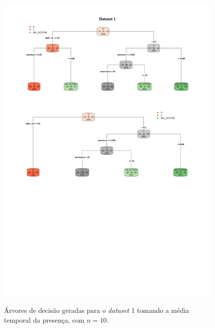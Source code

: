 \begin{figure}[hp]
	\centering
	\caption{Árvores de decisão geradas para o \textit{dataset} 1 tomando a média temporal da presença, com $n=10$.}
  \includegraphics[width=\textwidth]{imagens/teste_learning/5_1.pdf}
  \label{fig:teste_5_1}  
\end{figure}

